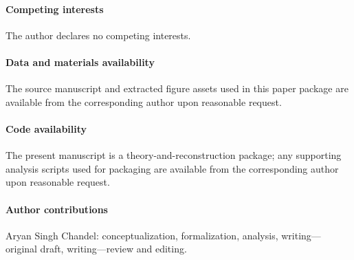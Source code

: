 \documentclass[11pt]{article}
\begin{document}
\paragraph{Competing interests} The author declares no competing interests.
\paragraph{Data and materials availability} The source manuscript and extracted figure assets used in this paper package are available from the corresponding author upon reasonable request.
\paragraph{Code availability} The present manuscript is a theory-and-reconstruction package; any supporting analysis scripts used for packaging are available from the corresponding author upon reasonable request.
\paragraph{Author contributions} Aryan Singh Chandel: conceptualization, formalization, analysis, writing---original draft, writing---review and editing.



\end{document}
